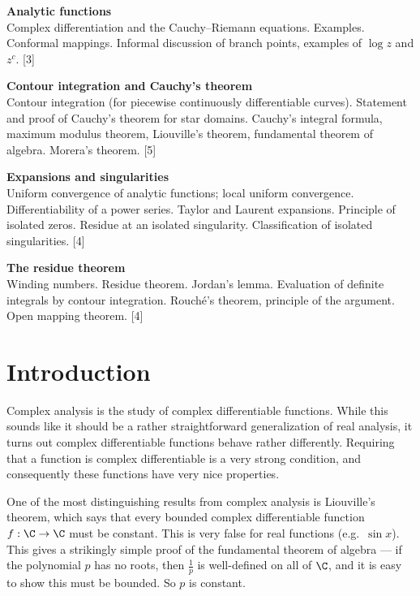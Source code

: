 \documentclass[a4paper]{article}
\begin{document}
\maketitle
{\small
\noindent\textbf{Analytic functions}\\
Complex differentiation and the Cauchy--Riemann equations. Examples. Conformal mappings. Informal discussion of branch points, examples of $\log z$ and $z^c$.\hspace*{\fill} [3]

\vspace{10pt}
\noindent\textbf{Contour integration and Cauchy's theorem}\\
Contour integration (for piecewise continuously differentiable curves). Statement and proof of Cauchy's theorem for star domains. Cauchy's integral formula, maximum modulus theorem, Liouville's theorem, fundamental theorem of algebra. Morera's theorem.\hspace*{\fill} [5]

\vspace{10pt}
\noindent\textbf{Expansions and singularities}\\
Uniform convergence of analytic functions; local uniform convergence. Differentiability of a power series. Taylor and Laurent expansions. Principle of isolated zeros. Residue at an isolated singularity. Classification of isolated singularities.\hspace*{\fill} [4]

\vspace{10pt}
\noindent\textbf{The residue theorem}\\
Winding numbers. Residue theorem. Jordan's lemma. Evaluation of definite integrals by contour integration. Rouch\'e's theorem, principle of the argument. Open mapping theorem.\hspace*{\fill} [4]}

\tableofcontents
\setcounter{section}{-1}
\section{Introduction}
Complex analysis is the study of complex differentiable functions. While this sounds like it should be a rather straightforward generalization of real analysis, it turns out complex differentiable functions behave rather differently. Requiring that a function is complex differentiable is a very strong condition, and consequently these functions have very nice properties.

One of the most distinguishing results from complex analysis is Liouville's theorem, which says that every bounded complex differentiable function $f: \C \to \C$ must be constant. This is very false for real functions (e.g.\ $\sin x$). This gives a strikingly simple proof of the fundamental theorem of algebra --- if the polynomial $p$ has no roots, then $\frac{1}{p}$ is well-defined on all of $\C$, and it is easy to show this must be bounded. So $p$ is constant.
\end{document}
